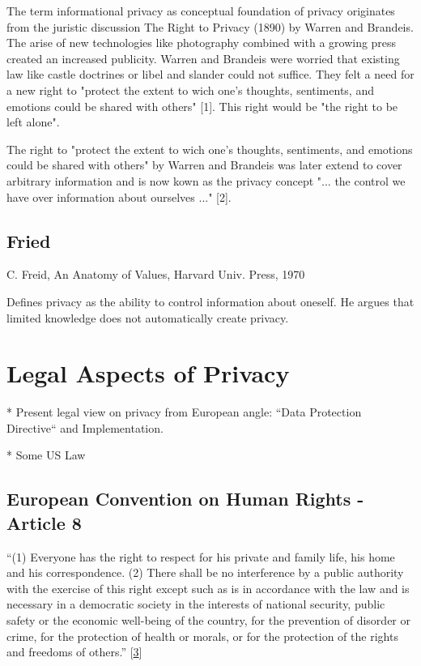 The term informational privacy as conceptual foundation of privacy originates from the juristic discussion The Right to Privacy (1890) by Warren and Brandeis.
The arise of new technologies like photography combined with a growing press created an increased publicity.
Warren and Brandeis were worried that existing law like castle doctrines or libel and slander could not suffice.
They felt a need for a new right to "protect the extent to wich one's thoughts, sentiments, and emotions could be shared with others" [1].
This right would be "the right to be left alone".

The right to "protect the extent to wich one's thoughts, sentiments, and emotions could be shared with others" by Warren and Brandeis was later extend to cover arbitrary information and is now kown as the privacy concept "... the control we have over information about ourselves ..." [2].

\subsection{Fried}

C. Freid, An Anatomy of Values, Harvard Univ. Press, 1970

Defines privacy as the ability to control information about oneself. He argues that limited knowledge does not automatically create privacy.

\section{Legal Aspects of Privacy}

* Present legal view on privacy from European angle: ``Data Protection Directive`` and Implementation.

* Some US Law

\subsection{European Convention on Human Rights - Article 8}

``(1) Everyone has the right to respect for his private and family life, his home and his correspondence. (2) There shall be no interference by a public authority with the exercise of this right except such as is in accordance with the law and is necessary in a democratic society in the interests of national security, public safety or the economic well-being of the country, for the prevention of disorder or crime, for the protection of health or morals, or for the protection of the rights and freedoms of others.'' {[}\hyperref[references]{3}{]}

